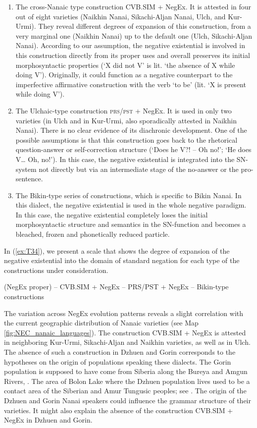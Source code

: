 \documentclass[output=paper]{langscibook}
\begin{document}
\begin{enumerate}[label=(\alph*)]
    \item The cross-Nanaic type construction CVB.SIM + NegEx. It is attested in four out of eight varieties (Naikhin Nanai, Sikachi-Aljan Nanai, Ulch, and Kur-Urmi). They reveal different degrees of expansion of this construction, from a very marginal one (Naikhin Nanai) up to the default one (Ulch, Sikachi-Aljan Nanai). According to our assumption, the negative existential is involved in this construction directly from its proper uses and overall preserves its initial morphosyntactic properties (‘X did not V’ is lit. ‘the absence of X while doing V’). Originally, it could function as a negative counterpart to the imperfective affirmative construction with the verb ‘to be’ (lit. ‘X is present while doing V’).
    \item The Ulchaic-type construction \textsc{prs/pst} + NegEx. It is used in only two varieties (in Ulch and in Kur-Urmi, also sporadically attested in Naikhin Nanai). There is no clear evidence of its diachronic development. One of the possible assumptions is that this construction goes back to the rhetorical question-answer or self-correction structure (‘Does he V?! – Oh no!’; ‘He does V… Oh, no!’). In this case, the negative existential is integrated into the SN-system not directly but via an intermediate stage of the no-answer or the pro-sentence.
    \item The Bikin-type series of constructions, which is specific to Bikin Nanai. In this dialect, the negative existential is used in the whole negative paradigm. In this case, the negative existential completely loses the initial morphosyntactic structure and semantics in the SN-function and becomes a bleached, frozen and phonetically reduced particle.
\end{enumerate}

In (\ref{ex:T34}), we present a scale that shows the degree of expansion of the negative existential into the domain of standard negation for each type of the constructions under consideration.

\begin{exe}\label{ex:T34}
    \ex (NegEx proper) – CVB.SIM + NegEx – PRS/PST + NegEx – Bikin-type constructions
\end{exe}

The variation across NegEx evolution patterns reveals a slight correlation with the current geographic distribution of Nanaic varieties (see Map \ref{fig:NEC_nanaic_languages}). The construction CVB.SIM + NegEx is attested in neighboring Kur-Urmi, Sikachi-Aljan and Naikhin varieties, as well as in Ulch. The absence of such a construction in Dzhuen and Gorin corresponds to the hypotheses on the origin of populations speaking these dialects. The Gorin population is supposed to have come from Siberia along the Bureya and Amgun Rivers, \citet[135]{maltseva2019a}. The area of Bolon Lake where the Dzhuen population lives used to be a contact area of the Siberian and Amur Tungusic peoples; see \citet{maltseva2019a}. The origin of the Dzhuen and Gorin Nanai speakers could influence the grammar structure of their varieties. It might also explain the absence of the construction CVB.SIM + NegEx in Dzhuen and Gorin.
\end{document}
